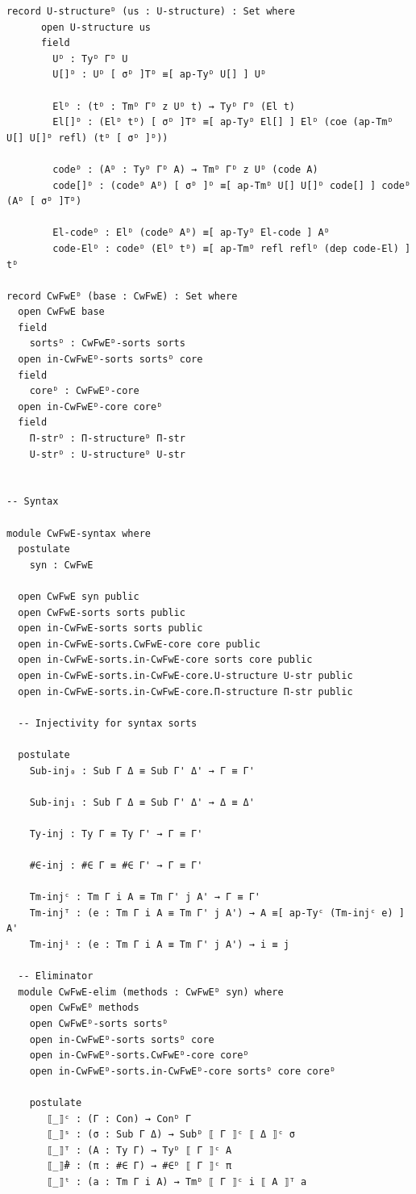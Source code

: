 {\begin{Verbatim}[breaklines=true,breakanywhere=true,fontsize=\scriptsize]
    record U-structureᴰ (us : U-structure) : Set where
      open U-structure us
      field
        Uᴰ : Tyᴰ Γᴰ U
        U[]ᴰ : Uᴰ [ σᴰ ]Tᴰ ≡[ ap-Tyᴰ U[] ] Uᴰ

        Elᴰ : (tᴰ : Tmᴰ Γᴰ z Uᴰ t) → Tyᴰ Γᴰ (El t)
        El[]ᴰ : (Elᴰ tᴰ) [ σᴰ ]Tᴰ ≡[ ap-Tyᴰ El[] ] Elᴰ (coe (ap-Tmᴰ U[] U[]ᴰ refl) (tᴰ [ σᴰ ]ᴰ))

        codeᴰ : (Aᴰ : Tyᴰ Γᴰ A) → Tmᴰ Γᴰ z Uᴰ (code A)
        code[]ᴰ : (codeᴰ Aᴰ) [ σᴰ ]ᴰ ≡[ ap-Tmᴰ U[] U[]ᴰ code[] ] codeᴰ (Aᴰ [ σᴰ ]Tᴰ)

        El-codeᴰ : Elᴰ (codeᴰ Aᴰ) ≡[ ap-Tyᴰ El-code ] Aᴰ
        code-Elᴰ : codeᴰ (Elᴰ tᴰ) ≡[ ap-Tmᴰ refl reflᴰ (dep code-El) ] tᴰ

record CwFwEᴰ (base : CwFwE) : Set where
  open CwFwE base
  field
    sortsᴰ : CwFwEᴰ-sorts sorts
  open in-CwFwEᴰ-sorts sortsᴰ core
  field
    coreᴰ : CwFwEᴰ-core
  open in-CwFwEᴰ-core coreᴰ
  field
    Π-strᴰ : Π-structureᴰ Π-str
    U-strᴰ : U-structureᴰ U-str


-- Syntax

module CwFwE-syntax where
  postulate
    syn : CwFwE

  open CwFwE syn public
  open CwFwE-sorts sorts public
  open in-CwFwE-sorts sorts public
  open in-CwFwE-sorts.CwFwE-core core public
  open in-CwFwE-sorts.in-CwFwE-core sorts core public
  open in-CwFwE-sorts.in-CwFwE-core.U-structure U-str public
  open in-CwFwE-sorts.in-CwFwE-core.Π-structure Π-str public

  -- Injectivity for syntax sorts

  postulate
    Sub-inj₀ : Sub Γ Δ ≡ Sub Γ' Δ' → Γ ≡ Γ'

    Sub-inj₁ : Sub Γ Δ ≡ Sub Γ' Δ' → Δ ≡ Δ'

    Ty-inj : Ty Γ ≡ Ty Γ' → Γ ≡ Γ'

    #∈-inj : #∈ Γ ≡ #∈ Γ' → Γ ≡ Γ'

    Tm-injᶜ : Tm Γ i A ≡ Tm Γ' j A' → Γ ≡ Γ'
    Tm-injᵀ : (e : Tm Γ i A ≡ Tm Γ' j A') → A ≡[ ap-Tyᶜ (Tm-injᶜ e) ] A'
    Tm-injⁱ : (e : Tm Γ i A ≡ Tm Γ' j A') → i ≡ j

  -- Eliminator
  module CwFwE-elim (methods : CwFwEᴰ syn) where
    open CwFwEᴰ methods
    open CwFwEᴰ-sorts sortsᴰ
    open in-CwFwEᴰ-sorts sortsᴰ core
    open in-CwFwEᴰ-sorts.CwFwEᴰ-core coreᴰ
    open in-CwFwEᴰ-sorts.in-CwFwEᴰ-core sortsᴰ core coreᴰ

    postulate
       ⟦_⟧ᶜ : (Γ : Con) → Conᴰ Γ
       ⟦_⟧ˢ : (σ : Sub Γ Δ) → Subᴰ ⟦ Γ ⟧ᶜ ⟦ Δ ⟧ᶜ σ
       ⟦_⟧ᵀ : (A : Ty Γ) → Tyᴰ ⟦ Γ ⟧ᶜ A
       ⟦_⟧̂# : (π : #∈ Γ) → #∈ᴰ ⟦ Γ ⟧ᶜ π
       ⟦_⟧ᵗ : (a : Tm Γ i A) → Tmᴰ ⟦ Γ ⟧ᶜ i ⟦ A ⟧ᵀ a


\end{Verbatim}}
